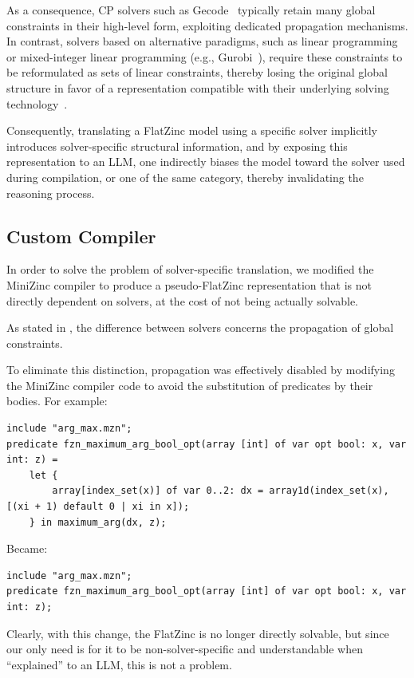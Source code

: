 \documentclass[../../main]{subfiles}
\begin{document}
As a consequence, CP solvers such as Gecode~\cite{Gecode} typically retain many global constraints in their high-level form, exploiting dedicated propagation mechanisms. In contrast, solvers based on alternative paradigms, such as linear programming or mixed-integer linear programming (e.g., Gurobi~\cite{Gurobi}), require these constraints to be reformulated as sets of linear constraints, thereby losing the original global structure in favor of a representation compatible with their underlying solving technology~\cite{CPvsMILPsolvers}.

Consequently, translating a FlatZinc model using a specific solver implicitly introduces solver-specific structural information, and by exposing this representation to an LLM, one indirectly biases the model toward the solver used during compilation, or one of the same category, thereby invalidating the reasoning process.

\subsection{Custom Compiler}
In order to solve the problem of solver-specific translation, we modified the MiniZinc compiler to produce a pseudo-FlatZinc representation that is not directly dependent on solvers, at the cost of not being actually solvable.

As stated in , the difference between solvers concerns the propagation of global constraints.

To eliminate this distinction, propagation was effectively disabled by modifying the MiniZinc compiler code to avoid the substitution of predicates by their bodies. For example:

\begin{lstlisting}[style=minizincstyle]
include "arg_max.mzn";
predicate fzn_maximum_arg_bool_opt(array [int] of var opt bool: x, var int: z) =
    let {
        array[index_set(x)] of var 0..2: dx = array1d(index_set(x), [(xi + 1) default 0 | xi in x]);
    } in maximum_arg(dx, z);
\end{lstlisting}

Became:

\begin{lstlisting}[style=minizincstyle]
include "arg_max.mzn";
predicate fzn_maximum_arg_bool_opt(array [int] of var opt bool: x, var int: z);  
\end{lstlisting}

Clearly, with this change, the FlatZinc is no longer directly solvable, but since our only need is for it to be non-solver-specific and understandable when ``explained'' to an LLM, this is not a problem.
\end{document}

